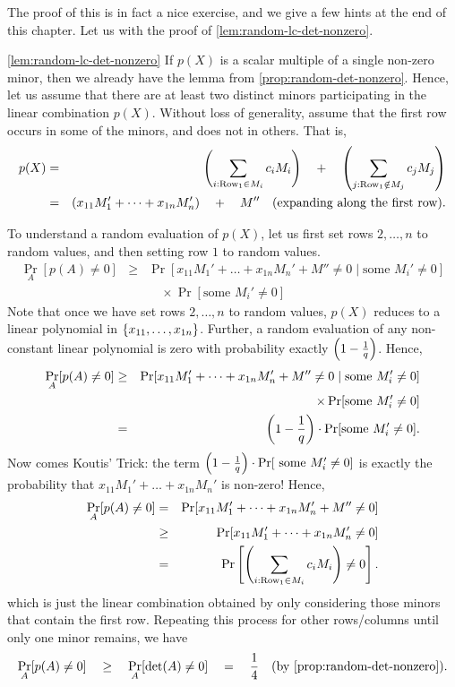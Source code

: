 The proof of this is in fact a nice exercise, and we give a few hints
at the end of this chapter. Let us with the proof of
\autoref{lem:random-lc-det-nonzero}.

\begin{proofof}{\autoref{lem:random-lc-det-nonzero}}
  If $p(X)$ is a scalar multiple of a single non-zero minor, then we
  already have the lemma from
  \autoref{prop:random-det-nonzero}. Hence, let us assume that
  there are at least two distinct minors participating in the linear
  combination $p(X)$. Without loss of generality, assume that the
  first row occurs in some of the minors, and does not in others. That is, 
  \begin{eqnarray*}
    p(X) &=& \left(\sum_{i:\text{Row}_1\in M_i} c_i M_i\right) \quad+ \quad \left(\sum_{j:\text{Row}_1\notin M_j} c_j M_j\right)\\
     & = & \left(x_{11} M_1' + \dots + x_{1n} M_{n}'\right) \quad+\quad M'' \quad\text{(expanding along the first row)}.
  \end{eqnarray*}
  
  To understand a random evaluation of $p(X)$, let us first set rows
  $2, \dots, n$ to random values, and then setting row $1$ to random
  values.
  \begin{eqnarray*}
    \Pr_{A}[p(A)\neq 0] & \geq & \Pr[x_{11} M_1' + \dots + x_{1n} M_n' + M'' \neq 0 \;|\; \text{some }M_{i}'\neq 0]\\
    & & \quad \times \Pr[\text{some }M_i' \neq 0]
  \end{eqnarray*}
  Note that once we have set rows $2,\dots, n$ to random values,
  $p(X)$ reduces to a linear polynomial in $\left\{x_{11},\dots,
    x_{1n}\right\}$. Further, a random evaluation of any non-constant linear
  polynomial is zero with probability exactly $\left(1
    -\frac{1}{q}\right)$. Hence,
  \begin{eqnarray*}
\Pr_{A}[p(A)\neq 0] & \geq & \Pr[x_{11} M_1' + \dots + x_{1n} M_n' + M'' \neq 0 \;|\; \text{some }M_{i}'\neq 0]\\
 & & \quad \times \Pr[\text{some }M_i' \neq 0]\\
    & = & \left(1 - \frac{1}{q}\right)\cdot \Pr[\text{some }M_i' \neq 0].
  \end{eqnarray*}
  Now comes  Koutis' Trick: the term $\left(1 -
    \frac{1}{q}\right) \cdot \Pr[\text{ some }M_i' \neq 0]$ is exactly the
  probability that $x_{11}M_1' + \dots + x_{1n}M_n'$ is non-zero! Hence,
\begin{eqnarray*}
\Pr_{A}[p(A) \neq 0] & = & \Pr[ x_{11}M_1' + \dots + x_{1n} M_n' + M''\neq 0]\\
 & \geq & \Pr[ x_{11}M_1' + \dots + x_{1n} M_n'\neq 0]\\
 & = & \Pr\left[\left(\sum_{i:\text{Row}_1\in M_i} c_i M_i\right) \neq 0\right].
\end{eqnarray*}
which is just the linear combination obtained by only considering
those minors that contain the first row. Repeating this process for other
rows/columns until only  one minor remains, we have
$$
\Pr_{A}[p(A) \neq 0] \quad \geq \quad \Pr_{A}[\det(A) \neq 0] \quad = \quad
\frac{1}{4}\quad(\text{by \autoref{prop:random-det-nonzero}}).
$$
\end{proofof}


